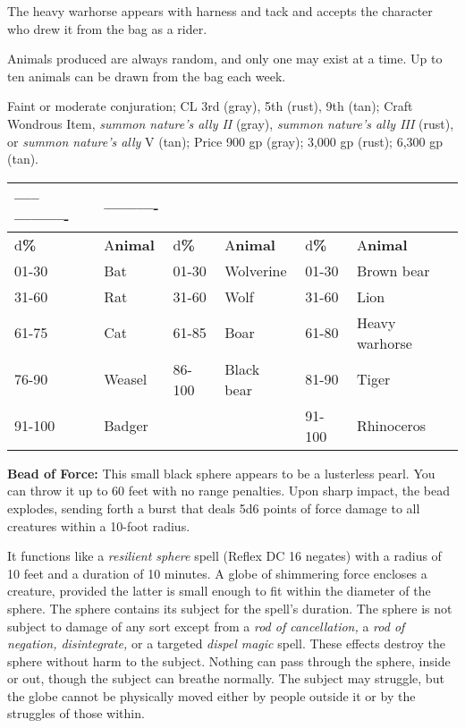 \documentclass{article}
\begin{document}
The heavy warhorse appears with harness and tack and accepts the character who 
drew it from the bag as a rider.

Animals produced are always random, and only one may exist at a time. Up to ten 
animals can be drawn from the bag each week.

Faint or moderate conjuration; CL 3rd (gray), 5th (rust), 9th (tan); Craft Wondrous 
Item, \textit{summon nature's ally II }(gray), \textit{summon nature's ally III 
}(rust), or \textit{summon nature's ally }V (tan); Price 900 gp (gray); 3,000 gp 
(rust); 6,300 gp (tan).

\begin{tabular}{|>{\raggedright}p{33pt}|>{\raggedright}p{35pt}|>{\raggedright}p{33pt}|>{\raggedright}p{46pt}|>{\raggedright}p{33pt}|>{\raggedright}p{69pt}|}
\hline
-----\multicolumn{2}{|p{69pt}|}{ \textit{\textbf{Gray ------}}}---------- & \multicolumn{2}{p{80pt}|}{ 
\textit{\textbf{Rust --------}}}---------- & \multicolumn{2}{p{102pt}|}{ \textit{\textbf{Tan 
----------}}}\tabularnewline
\hline
d\textbf{\%} & A\textbf{nimal} & d\textbf{\%} & A\textbf{nimal} & d\textbf{\%} & A\textbf{nimal}\tabularnewline
\hline
01-30 & Bat & 01-30 & Wolverine & 01-30 & Brown bear\tabularnewline
\hline
31-60 & Rat & 31-60 & Wolf & 31-60 & Lion\tabularnewline
\hline
61-75 & Cat & 61-85 & Boar & 61-80 & Heavy warhorse\tabularnewline
\hline
76-90 & Weasel & 86-100 & Black bear & 81-90 & Tiger\tabularnewline
\hline
91-100 & Badger &  &  & 91-100 & Rhinoceros\tabularnewline
\hline
\end{tabular}

\textbf{Bead of Force:} This small black sphere appears to be a lusterless pearl. 
You can throw it up to 60 feet with no range penalties. Upon sharp impact, the 
bead explodes, sending forth a burst that deals 5d6 points of force damage to all 
creatures within a 10-foot radius.

It functions like a\textit{ resilient sphere }spell (Reflex DC 16 negates) with 
a radius of 10 feet and a duration of 10 minutes. A globe of shimmering force encloses 
a creature, provided the latter is small enough to fit within the diameter of the 
sphere. The sphere contains its subject for the spell's duration. The sphere is 
not subject to damage of any sort except from a \textit{rod of cancellation, }a 
\textit{rod of negation, disintegrate, }or a targeted \textit{dispel magic }spell. 
These effects destroy the sphere without harm to the subject. Nothing can pass 
through the sphere, inside or out, though the subject can breathe normally. The 
subject may struggle, but the globe cannot be physically moved either by people 
outside it or by the struggles of those within.
\end{document}
